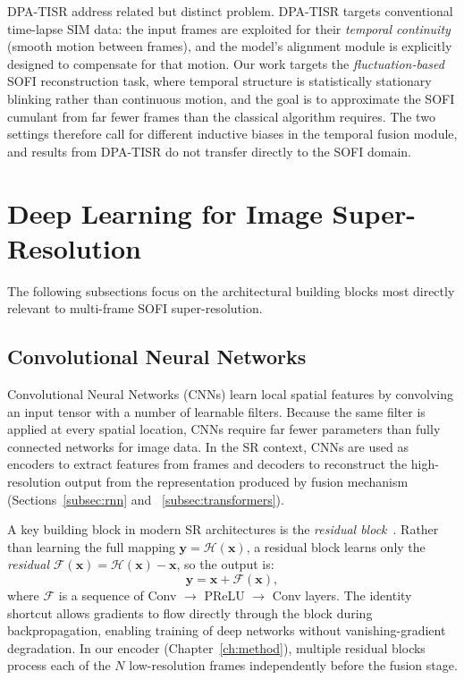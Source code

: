 DPA-TISR address related but distinct problem. 
DPA-TISR targets conventional time-lapse SIM data: the input frames are exploited for their 
\emph{temporal continuity} (smooth motion between frames), and the model's alignment module is 
explicitly designed to compensate for that motion. 
Our work targets the \emph{fluctuation-based} SOFI reconstruction task, where temporal structure 
is statistically stationary blinking rather than continuous motion, and the goal is to approximate 
the SOFI cumulant from far fewer frames than the classical algorithm requires. 
The two settings therefore call for different inductive biases in the temporal fusion module, 
and results from DPA-TISR do not transfer directly to the SOFI domain.

\section{Deep Learning for Image Super-Resolution}
\label{sec:dl_bg}
The following subsections focus on the architectural building blocks most directly relevant to 
multi-frame SOFI super-resolution.

\subsection{Convolutional Neural Networks}
\label{subsec:cnn} 

Convolutional Neural Networks (CNNs) learn local spatial features by convolving an input tensor with a 
number of learnable filters. 
Because the same filter is applied at every spatial location, 
CNNs require far fewer parameters than fully connected networks for 
image data. In the SR context, CNNs are used as encoders to extract features from frames 
and decoders to reconstruct the high-resolution output from the representation produced by fusion mechanism
(Sections~\ref{subsec:rnn} and ~\ref{subsec:transformers}).

A key building block in modern SR architectures is the \emph{residual block}~\cite{residual2015}. 
Rather than learning the full mapping $\mathbf{y} = \mathcal{H}(\mathbf{x})$, a residual block learns 
only the \emph{residual} $\mathcal{F}(\mathbf{x}) = \mathcal{H}(\mathbf{x}) - \mathbf{x}$, so the output 
is:
\begin{equation}
    \mathbf{y} = \mathbf{x} + \mathcal{F}(\mathbf{x}),
    \label{eq:residual}
\end{equation}
where $\mathcal{F}$ is a sequence of Conv $\to$ PReLU $\to$ Conv layers. 
The identity shortcut allows gradients to flow directly through the block during backpropagation, 
enabling training of deep networks without vanishing-gradient degradation. 
In our encoder (Chapter~\ref{ch:method}), multiple residual blocks process each of the $N$ low-resolution 
frames independently before the fusion stage.

